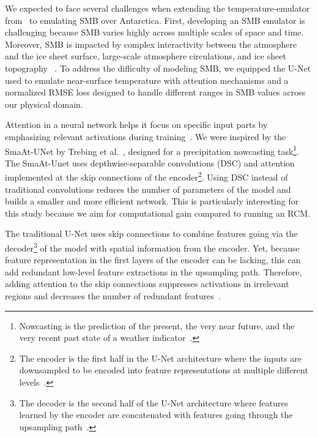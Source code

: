 \documentclass[a4paper,11pt,oneside]{report}
\begin{document}
    
We expected to face several challenges when extending the temperature-emulator from~\cite{Doury} to emulating SMB over Antarctica. First, developing an SMB emulator is challenging because SMB varies highly across multiple scales of space and time. Moreover, SMB is impacted by complex interactivity between the atmosphere and the ice sheet surface, large-scale atmosphere circulations, and ice sheet topography ~\cite{Lenaerts2019}. To address the difficulty of modeling SMB, we equipped the U-Net used to emulate near-surface temperature with attention mechanisms and a normalized RMSE loss designed to handle different ranges in SMB values across our physical domain. 
    
Attention in a neural network helps it focus on specific input parts by emphasizing relevant activations during training~\cite{Sanghyun2018, AttentionUNet, Oktay2018}. We were inspired by the SmaAt-UNet by Trebing et al.~\cite{smatunet}, designed for a precipitation nowcasting task\footnote{Nowcasting is the prediction of the present, the very near future, and the very recent past state of a weather indicator~\cite{Nowcasting}.}. The SmaAt-Unet uses depthwise-separable convolutions (DSC) and attention implemented at the skip connections of the encoder\footnote{The encoder is the first half in the U-Net architecture where the inputs are downsampled to be encoded into feature representations at multiple different levels~\cite{Encoder}.}. Using DSC instead of traditional convolutions reduces the number of parameters of the model and builds a smaller and more efficient network. This is particularly interesting for this study because we aim for computational gain compared to running an RCM.     
    
The traditional U-Net uses skip connections to combine features going via the decoder\footnote{The decoder is the second half of the U-Net architecture where features learned by the encoder are concatenated with features going through the upsampling path~\cite{Encoder}.} of the model with spatial information from the encoder. Yet, because feature representation in the first layers of the encoder can be lacking, this can add redundant low-level feature extractions in the upsampling path. Therefore, adding attention to the skip connections suppresses activations in irrelevant regions and decreases the number of redundant features~\cite{AttentionUNet}.
    
\end{document}
